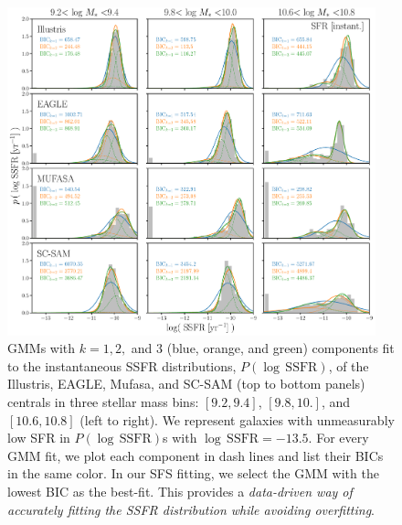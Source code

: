 \documentclass[tighten, preprint]{aastex62}
\begin{document}
\begin{figure}
\begin{center}
\includegraphics[width=0.95\textwidth]{Pssfr_GMMcomps_inst.pdf} 
\caption{GMMs with $k=1, 2,$ and $3$ (blue, orange, and green) components fit
to the instantaneous SSFR distributions, $P(\log\,\mathrm{SSFR})$, of the 
Illustris, EAGLE, {\sc Mufasa}, and SC-SAM (top to bottom panels) centrals 
in three stellar mass bins: $[9.2, 9.4]$, $[9.8, 10.]$, and $[10.6, 10.8]$ 
(left to right). We represent galaxies with unmeasurably low SFR in 
$P(\log\,\mathrm{SSFR})$s with $\log\,\mathrm{SSFR} = -13.5$. 
For every GMM fit, we plot each component in dash lines 
and list their BICs in the same color. In our SFS fitting, we select the 
GMM with the lowest BIC as the best-fit. This provides a \emph{data-driven 
way of accurately fitting the SSFR distribution while avoiding overfitting}.
} 
\label{fig:pssfr_gmm_inst}
\end{center}
\end{figure}
\end{document}
